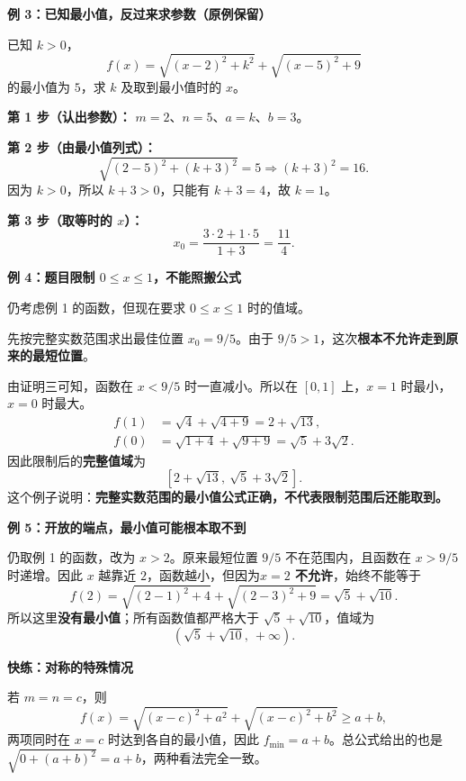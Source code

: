 \clearpage
\begin{examplebox}
\textbf{\textcolor{CExample}{例 3：已知最小值，反过来求参数（原例保留）}}



已知 $k>0$，
\[
 f(x)=\sqrt{(x-2)^2+k^2}+\sqrt{(x-5)^2+9}
\]
的最小值为 $5$，求 $k$ 及取到最小值时的 $x$。

\textbf{第 1 步（认出参数）：} $m=2$、$n=5$、$a=k$、$b=3$。

\textbf{第 2 步（由最小值列式）：}
\[
 \sqrt{(2-5)^2+(k+3)^2}=5
 \Longrightarrow (k+3)^2=16.
\]
因为 $k>0$，所以 $k+3>0$，只能有 $k+3=4$，故 $\boxed{k=1}$。

\textbf{第 3 步（取等时的 $x$）：}
\[
 x_0=\frac{3\cdot2+1\cdot5}{1+3}=\boxed{\frac{11}{4}}.
\]

\medskip
\end{examplebox}
\clearpage
\begin{examplebox}
\textbf{\textcolor{CExample}{例 4：题目限制 $0\leq x\leq1$，不能照搬公式}}



仍考虑例 1 的函数，但现在要求 $0\leq x\leq1$ 时的值域。

先按完整实数范围求出最佳位置 $x_0=9/5$。由于 $9/5>1$，这次\textbf{根本不允许走到原来的最短位置}。

由证明三可知，函数在 $x<9/5$ 时一直减小。所以在 $[0,1]$ 上，$x=1$ 时最小，$x=0$ 时最大。
\[
 \begin{aligned}
 f(1)&=\sqrt4+\sqrt{4+9}=2+\sqrt{13},\\
 f(0)&=\sqrt{1+4}+\sqrt{9+9}=\sqrt5+3\sqrt2.
 \end{aligned}
\]
因此限制后的\textbf{完整值域}为
\[
 \boxed{\left[2+\sqrt{13},\ \sqrt5+3\sqrt2\right]}.
\]
这个例子说明：\textbf{完整实数范围的最小值公式正确，不代表限制范围后还能取到。}

\medskip
\end{examplebox}
\clearpage
\begin{examplebox}
\textbf{\textcolor{CExample}{例 5：开放的端点，最小值可能根本取不到}}



仍取例 1 的函数，改为 $x>2$。原来最短位置 $9/5$ 不在范围内，且函数在 $x>9/5$ 时递增。因此 $x$ 越靠近 $2$，函数越小，但因为\textbf{$x=2$ 不允许}，始终不能等于
\[
 f(2)=\sqrt{(2-1)^2+4}+\sqrt{(2-3)^2+9}
 =\sqrt5+\sqrt{10}.
\]
所以这里\textbf{没有最小值}；所有函数值都严格大于 $\sqrt5+\sqrt{10}$，值域为
\[
 \boxed{\left(\sqrt5+\sqrt{10},\ +\infty\right)}.
\]

\medskip
\end{examplebox}
\clearpage
\begin{examplebox}
\textbf{\textcolor{CExample}{快练：对称的特殊情况}}



若 $m=n=c$，则
\[
 f(x)=\sqrt{(x-c)^2+a^2}+\sqrt{(x-c)^2+b^2}\geq a+b,
\]
两项同时在 $x=c$ 时达到各自的最小值，因此 $f_{\min}=a+b$。总公式给出的也是 $\sqrt{0+(a+b)^2}=a+b$，两种看法完全一致。
\end{examplebox}
